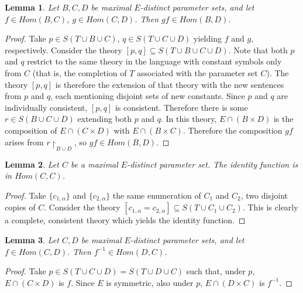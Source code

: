 \documentclass[letterpaper,twoside]{article}
\newtheorem{lemma}{Lemma}[theorem]
\theoremstyle{definition}
\theoremstyle{remark}
\begin{document}
\begin{lemma}\label{lemma-galoiscomposition}
  Let \(B,C,D\) be maximal \(E\)-distinct parameter sets, and let \(f
  \in Hom(B,C)\), \(g \in Hom(C,D)\).  Then \(gf \in Hom(B,D)\).
\end{lemma}
\begin{proof}
  Take \(p \in S(T \cup B \cup C)\), \(q \in S(T \cup C \cup D)\)
  yielding \(f\) and \(g\), respectively.  Consider the theory \([p,
    q] \subseteq S(T \cup B \cup C \cup D)\).  Note that both \(p\)
  and \(q\) restrict to the same theory in the language with constant
  symbols only from \(C\) (that is, the completion of \(T\) associated
  with the parameter set \(C\)).  The theory \([p,q]\) is therefore
  the extension of that theory with the new sentences from \(p\) and
  \(q\), each mentioning disjoint sets of new constants.  Since \(p\)
  and \(q\) are individually consistent, \([p,q]\) is consistent.
  Therefore there is some \(r \in S(B \cup C \cup D)\) extending both
  \(p\) and \(q\).  In this theory, \(E \cap (B \times D)\) is the
  composition of \(E \cap (C \times D)\) with \(E \cap (B \times C)\).
  Therefore the composition \(gf\) arises from \(r \restriction_{B
    \cup D}\), so \(gf \in Hom(B,D)\).
\end{proof}

\begin{lemma}\label{lemma-galoisidentity}
  Let \(C\) be a maximal \(E\)-distinct parameter set.  The identity
  function is in \(Hom(C,C)\).
\end{lemma}
\begin{proof}
  Take \(\{c_{1,\alpha}\}\) and \(\{c_{2,\alpha}\}\) the same
  enumeration of \(C_1\) and \(C_2\), two disjoint copies of \(C\).
  Consider the theory \([c_{1,\alpha} = c_{2,\alpha}] \subseteq S(T
  \cup C_1 \cup C_2)\).  This is clearly a complete, consistent theory
  which yields the identity function.
\end{proof}

\begin{lemma}\label{lemma-galoisinverses}
  Let \(C, D\) be maximal \(E\)-distinct parameter sets, and let \(f
  \in Hom(C,D)\).  Then \(f^{-1} \in Hom(D,C)\).
\end{lemma}
\begin{proof}
  Take \(p \in S(T \cup C \cup D) = S(T \cup D \cup C)\) such that,
  under \(p\), \(E \cap (C \times D)\) is \(f\).  Since \(E\) is
  symmetric, also under \(p\), \(E \cap (D \times C)\) is \(f^{-1}\).
\end{proof}
\end{document}

